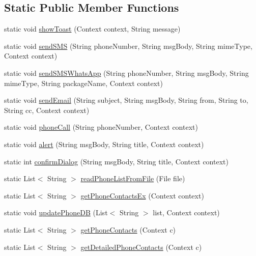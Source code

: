 \subsection*{Static Public Member Functions}
\begin{DoxyCompactItemize}
\item 
static void \hyperlink{classcourse_1_1examples_1_1phoneapp_1_1_utility_a79e295a2526fd5fa44894beeca99f340}{show\+Toast} (Context context, String message)
\item 
static void \hyperlink{classcourse_1_1examples_1_1phoneapp_1_1_utility_a5f33366b0ef1f6e6cc3e25c35dc1e0b6}{send\+S\+M\+S} (String phone\+Number, String msg\+Body, String mime\+Type, Context context)
\item 
static void \hyperlink{classcourse_1_1examples_1_1phoneapp_1_1_utility_a8b997770364b4ae7620db3e18716ec2d}{send\+S\+M\+S\+Whats\+App} (String phone\+Number, String msg\+Body, String mime\+Type, String package\+Name, Context context)
\item 
static void \hyperlink{classcourse_1_1examples_1_1phoneapp_1_1_utility_a1435fdd4dd435034a5d866a6d586e68a}{send\+Email} (String subject, String msg\+Body, String from, String to, String cc, Context context)
\item 
static void \hyperlink{classcourse_1_1examples_1_1phoneapp_1_1_utility_a6532b2cd02df1fa71b50362636401628}{phone\+Call} (String phone\+Number, Context context)
\item 
static void \hyperlink{classcourse_1_1examples_1_1phoneapp_1_1_utility_a52a9f17fcb5689b3da8038811ee6abf4}{alert} (String msg\+Body, String title, Context context)
\item 
static int \hyperlink{classcourse_1_1examples_1_1phoneapp_1_1_utility_a01fad705fa764f0d337f90069427ffb5}{confirm\+Dialog} (String msg\+Body, String title, Context context)
\item 
static List$<$ String $>$ \hyperlink{classcourse_1_1examples_1_1phoneapp_1_1_utility_a578fd485bd50d243570a8eed4af04bc9}{read\+Phone\+List\+From\+File} (File file)
\item 
static List$<$ String $>$ \hyperlink{classcourse_1_1examples_1_1phoneapp_1_1_utility_ab87f4ad40f39634a8705bb47ae674727}{get\+Phone\+Contacts\+Ex} (Context context)
\item 
static void \hyperlink{classcourse_1_1examples_1_1phoneapp_1_1_utility_a1e30a36857885efeacdf33996403a26f}{update\+Phone\+D\+B} (List$<$ String $>$ list, Context context)
\item 
static List$<$ String $>$ \hyperlink{classcourse_1_1examples_1_1phoneapp_1_1_utility_a5ef96751af1965557ef365d7426044fa}{get\+Phone\+Contacts} (Context c)
\item 
static List$<$ String $>$ \hyperlink{classcourse_1_1examples_1_1phoneapp_1_1_utility_aa34007fd1fb09ca6de7861b30690c942}{get\+Detailed\+Phone\+Contacts} (Context c)
\end{DoxyCompactItemize}
